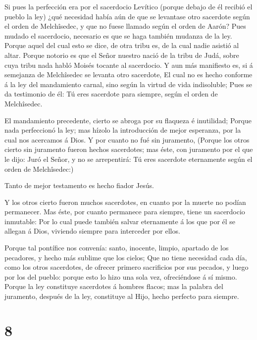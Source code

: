  Si pues la perfección era por el sacerdocio Levítico
(porque debajo de él recibió el pueblo la ley) ¿qué necesidad había aún
de que se levantase otro sacerdote según el orden de Melchîsedec, y que
no fuese llamado según el orden de Aarón?  Pues mudado el
sacerdocio, necesario es que se haga también mudanza de la ley.
 Porque aquel del cual esto se dice, de otra tribu es, de
la cual nadie asistió al altar.  Porque notorio es que el
Señor nuestro nació de la tribu de Judá, sobre cuya tribu nada habló
Moisés tocante al sacerdocio.  Y aun más manifiesto es, si
á semejanza de Melchîsedec se levanta otro sacerdote,  El
cual no es hecho conforme á la ley del mandamiento carnal, sino según la
virtud de vida indisoluble;  Pues se da testimonio de él:
Tú eres sacerdote para siempre, según el orden de Melchîsedec.

 El mandamiento precedente, cierto se abroga por su
flaqueza é inutilidad;  Porque nada perfeccionó la ley; mas
hízolo la introducción de mejor esperanza, por la cual nos acercamos á
Dios.  Y por cuanto no fué sin juramento, 
(Porque los otros cierto sin juramento fueron hechos sacerdotes; mas
éste, con juramento por el que le dijo: Juró el Señor, y no se
arrepentirá: Tú eres sacerdote eternamente según el orden de
Melchîsedec:)

 Tanto de mejor testamento es hecho fiador Jesús.

 Y los otros cierto fueron muchos sacerdotes, en cuanto por
la muerte no podían permanecer.  Mas éste, por cuanto
permanece para siempre, tiene un sacerdocio inmutable:  Por
lo cual puede también salvar eternamente á los que por él se allegan á
Dios, viviendo siempre para interceder por ellos.

 Porque tal pontífice nos convenía: santo, inocente,
limpio, apartado de los pecadores, y hecho más sublime que los cielos;
 Que no tiene necesidad cada día, como los otros
sacerdotes, de ofrecer primero sacrificios por sus pecados, y luego por
los del pueblo: porque esto lo hizo una sola vez, ofreciéndose á sí
mismo.  Porque la ley constituye sacerdotes á hombres
flacos; mas la palabra del juramento, después de la ley, constituye al
Hijo, hecho perfecto para siempre.

\hypertarget{section-7}{%
\section{8}\label{section-7}}

